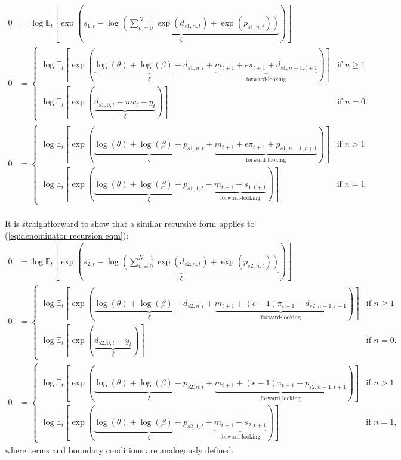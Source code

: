 \documentclass[12 pt, oneside]{article}
\theoremstyle{definition}
\theoremstyle{definition}
\theoremstyle{definition}
\newcommand{\E}{\mathbb{E}}
\begin{document}
\begin{align}
  0 & = \log\E_t\left[\exp\left(\underbrace{s_{1, t} - \log\left(\sum_{n = 0}^{N - 1}\exp(d_{s1, n, t}) + \exp(p_{s1, n, t})\right)}_{\xi}\right)\right]\\
  0 & =
      \begin{cases}
        \log\E_t\left[\exp\left(\underbrace{\log(\theta) + \log(\beta) - d_{s1, n, t}}_{\xi} + \underbrace{m_{t + 1} + \epsilon \pi_{t + 1} + d_{s1, n - 1, t + 1}}_{\text{forward-looking}}\right)\right] & \text{if } n \geq 1\\
        \log\E_t\left[\exp\left(\underbrace{d_{s1, 0, t} - mc_t - y_t}_{\xi}\right)\right] & \text{if } n = 0.
      \end{cases}\\
  0 & =
      \begin{cases}
        \log\E_t\left[\exp\left(\underbrace{\log(\theta) + \log(\beta) - p_{s1, n, t}}_{\xi} + \underbrace{m_{t + 1} + \epsilon \pi_{t + 1} + p_{s1, n - 1, t + 1}}_{\text{forward-looking}} \right)\right] & \text{if } n > 1\\
        \log\E_t\left[\exp\left(\underbrace{\log(\theta) + \log(\beta) - p_{s1, 1, t}}_{\xi} + \underbrace{m_{t + 1} + s_{1, t + 1}}_{\text{forward-looking}}\right)\right] & \text{if } n = 1.
      \end{cases}
\end{align}
\\

It is straightforward to show that a similar recursive form applies to (\ref{eq:denominator recursion eqm}):
\begin{align}
  0 & = \log\E_t\left[\exp\left(\underbrace{s_{2, t} - \log\left(\sum_{n = 0}^{N - 1}\exp(d_{s2, n, t}) + \exp(p_{s2, n, t})\right)}_{\xi}\right)\right]\\
  0 & =
      \begin{cases}
        \log\E_t\left[\exp\left(\underbrace{\log(\theta) + \log(\beta) - d_{s2, n, t}}_{\xi} + \underbrace{m_{t + 1} + (\epsilon - 1) \pi_{t + 1} + d_{s2, n - 1, t + 1}}_{\text{forward-looking}}\right)\right] & \text{if } n \geq 1\\
        \log\E_t\left[\exp\left(\underbrace{d_{s2, 0, t} - y_t}_{\xi}\right)\right] & \text{if } n = 0.
      \end{cases}\\
  0 & =
      \begin{cases}
        \log\E_t\left[\exp\left(\underbrace{\log(\theta) + \log(\beta) - p_{s2, n, t}}_{\xi} + \underbrace{m_{t + 1} + (\epsilon - 1) \pi_{t + 1} + p_{s2, n - 1, t + 1}}_{\text{forward-looking}} \right)\right] & \text{if } n > 1\\
        \log\E_t\left[\exp\left(\underbrace{\log(\theta) + \log(\beta) - p_{s2, 1, t}}_{\xi} + \underbrace{m_{t + 1} + s_{2, t + 1}}_{\text{forward-looking}}\right)\right] & \text{if } n = 1,
      \end{cases}
\end{align}
where terms and boundary conditions are analogously defined.
\end{document}
